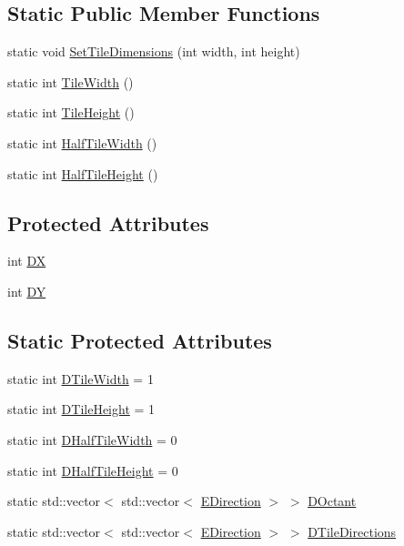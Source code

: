\subsection*{Static Public Member Functions}
\begin{DoxyCompactItemize}
\item 
static void \hyperlink{classCPosition_a506e9efd21e209e36533ba7e594be75f}{Set\+Tile\+Dimensions} (int width, int height)
\item 
static int \hyperlink{classCPosition_a27a7a8b9a5541da0aa8d97d785650fb8}{Tile\+Width} ()
\item 
static int \hyperlink{classCPosition_ac4f0edd9c9632f1bdca981ef5d9b71e5}{Tile\+Height} ()
\item 
static int \hyperlink{classCPosition_a4b799a0fb78ddd8bbd8548980e2458af}{Half\+Tile\+Width} ()
\item 
static int \hyperlink{classCPosition_a5e371060b1aa0d3d3c5df1e353e0e5fd}{Half\+Tile\+Height} ()
\end{DoxyCompactItemize}
\subsection*{Protected Attributes}
\begin{DoxyCompactItemize}
\item 
int \hyperlink{classCPosition_a28445f9b872169715919074d82044eda}{DX}
\item 
int \hyperlink{classCPosition_a84139c9e8eb547e7cf3cb851739943a4}{DY}
\end{DoxyCompactItemize}
\subsection*{Static Protected Attributes}
\begin{DoxyCompactItemize}
\item 
static int \hyperlink{classCPosition_ac17d12fb5d35fcf62d63bb42e8cf7ed6}{D\+Tile\+Width} = 1
\item 
static int \hyperlink{classCPosition_a202ebb83e86df75cfb76cf1241ba817c}{D\+Tile\+Height} = 1
\item 
static int \hyperlink{classCPosition_a3227e835d9008346e9d91bdad2380f14}{D\+Half\+Tile\+Width} = 0
\item 
static int \hyperlink{classCPosition_a1e0af68f7690b3cfc14687cf7fbe7ade}{D\+Half\+Tile\+Height} = 0
\item 
static std\+::vector$<$ std\+::vector$<$ \hyperlink{GameDataTypes_8h_acb2b033915f6659a71a38b5aa6e4eb42}{E\+Direction} $>$ $>$ \hyperlink{classCPosition_a0f7a420e82a180b983e32258729bb984}{D\+Octant}
\item 
static std\+::vector$<$ std\+::vector$<$ \hyperlink{GameDataTypes_8h_acb2b033915f6659a71a38b5aa6e4eb42}{E\+Direction} $>$ $>$ \hyperlink{classCPosition_ab4bc566d2d14d378cfdf6b1d2d3f522e}{D\+Tile\+Directions}
\end{DoxyCompactItemize}


